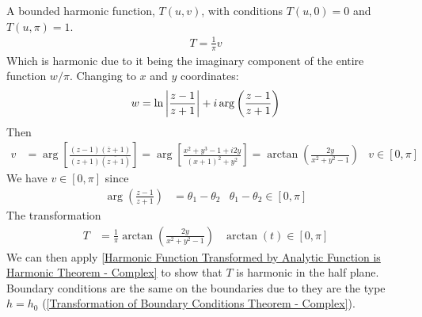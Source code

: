 \documentclass[12pt, english]{book}
\begin{document}
\begin{figure}[H]
	\end{figure}
	
	A bounded harmonic function, \(T(u,v)\), with conditions \(T(u,0) = 0\) and \(T(u,\pi) = 1\).
	\begin{align*}
		T = \frac{1}{\pi} v
	\end{align*}
	Which is harmonic due to it being the imaginary component of the entire function \(w / \pi\). Changing to \(x\) and \(y\) coordinates:
	\begin{align*}
		w = \ln\abs{\frac{z-1}{z+1}} + i \arg\left(\frac{z-1}{z+1} \right)
	\end{align*}
	Then
	\begin{align*}
		v & 
		= \arg\left[\frac{(z-1)(\bar{z} + 1)}{(z+1)(\overline{z+1})} \right] 
		= \arg\left[\frac{x^2 + y^3 - 1 + i2y}{(x+1)^2 + y^2} \right] 
		= \arctan(\frac{2y}{x^2 + y^2 - 1}) &
		v \in [0,\pi]
	\end{align*}
	We have \(v \in [0, \pi]\) since 
	\begin{align*}
		\arg\left(\frac{z-1}{z+1}\right) &= \theta_1 - \theta_2
		& \theta_1 - \theta_2 \in [0, \pi]
	\end{align*}
	The transformation
	\begin{align*}
		T &= \frac{1}{\pi} \arctan(\frac{2y}{x^2 + y^2 - 1})	&
		\arctan(t) \in [0, \pi]
	\end{align*}
	We can then apply \cref{Harmonic Function Transformed by Analytic Function is Harmonic Theorem - Complex} to show that \(T\) is harmonic in the half plane. Boundary conditions are the same on the boundaries due to they are the type \(h = h_0\) (\cref{Transformation of Boundary Conditions Theorem - Complex}).
	
\end{document}
